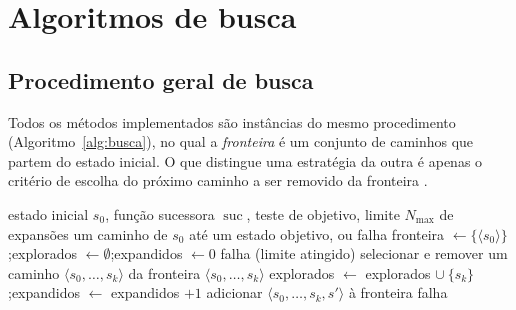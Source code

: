 \documentclass[12pt,a4paper]{article}
\begin{document}

\section{Algoritmos de busca}
\label{sec:algoritmos}

\subsection{Procedimento geral de busca}
\label{sec:procedimento-geral}

Todos os métodos implementados são instâncias do mesmo procedimento (Algoritmo~\ref{alg:busca}), no qual a \emph{fronteira} é um conjunto de caminhos que partem do estado inicial. O que distingue uma estratégia da outra é apenas o critério de escolha do próximo caminho a ser removido da fronteira \citep{poole2017}.

\begin{algorithm}[H]
  \caption{Procedimento geral de busca em grafo com poda de estados repetidos.}
  \label{alg:busca}
  \begin{algorithmic}[1]
    \Require estado inicial $s_0$, função sucessora $\operatorname{suc}$, teste de objetivo, limite $N_{\max}$ de expansões
    \Ensure um caminho de $s_0$ até um estado objetivo, ou falha
    \State fronteira $\gets \{\langle s_0\rangle\}$;\quad explorados $\gets \emptyset$;\quad expandidos $\gets 0$
       \Return falha (limite atingido) \EndIf
      \State selecionar e remover um caminho $\langle s_0,\ldots,s_k\rangle$ da fronteira 
       \Return $\langle s_0,\ldots,s_k\rangle$ \EndIf
      \State explorados $\gets$ explorados $\cup\ \{s_k\}$;\quad expandidos $\gets$ expandidos $+ 1$
         
          \State adicionar $\langle s_0,\ldots,s_k,s'\rangle$ à fronteira
        \EndIf
      \EndFor
    \EndWhile
    \State \Return falha
  \end{algorithmic}
\end{algorithm}
\end{document}
